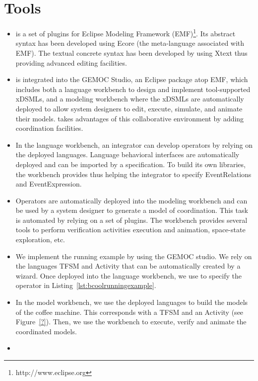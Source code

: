 \section{Tools}
\label{section:bcoollengbench}

\begin{itemize}
	\item \bcool is a set of plugins for Eclipse Modeling Framework (EMF)\footnote{http://www.eclipse.org}. Its abstract syntax has been developed using Ecore (\ie the meta-language associated with EMF). The textual concrete syntax has been developed by using Xtext thus providing advanced editing facilities.
	
	\item \bcool is integrated into the GEMOC Studio, an Eclipse package atop EMF, which includes both a language workbench to design and implement tool-supported xDSMLs, and a modeling workbench where the xDSMLs are automatically deployed to allow system designers to edit, execute, simulate, and animate their models. \bcool takes advantages of this collaborative environment by adding coordination facilities. 
	
	\item In the language workbench, an integrator can develop operators by relying on the deployed languages. Language behavioral interfaces are automatically deployed and can be imported by a \bcool specification. To build its own libraries, the workbench provides \moccml thus helping the integrator to specify EventRelations and EventExpression.   
	
	\item Operators are automatically deployed into the modeling workbench and can be used by a system designer to generate a model of coordination. This task is automated by relying on a set of plugins. The workbench provides several tools to perform verification activities \eg execution and animation, space-state exploration, etc.  

	\item We implement the running example by using the GEMOC studio. We rely on the languages TFSM and Activity that can be automatically created by a wizard. Once deployed into the language workbench, we use \bcool to specify the operator in Listing~\ref{lst:bcoolrunningexample}. 
	
	\item In the model workbench, we use the deployed languages to build the models of the coffee machine. This corresponds with a TFSM and an Activity (see Figure~\ref{?}). Then, we use the workbench to execute, verify and animate the coordinated models.   
	
	\item {}
\end{itemize}
  

